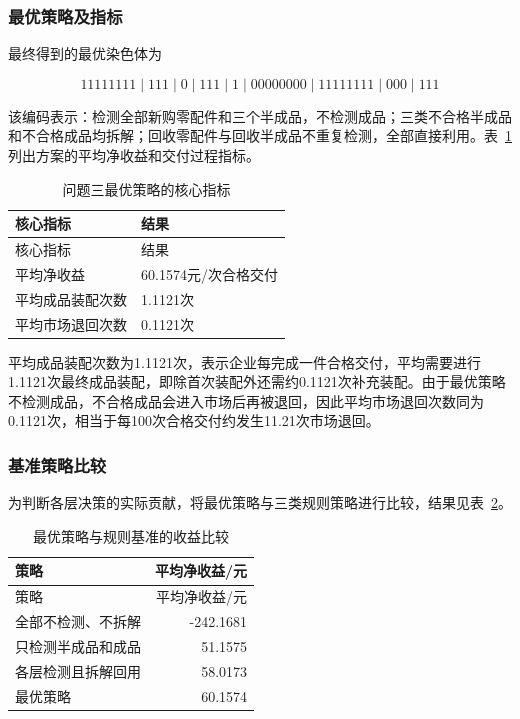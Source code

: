 \documentclass{cumcm}
\numberwithin{figure}{section}
\numberwithin{table}{section}
\begin{document}
\subsubsection{最优策略及指标}\label{ux6700ux4f18ux7b56ux7565ux53caux6307ux6807}

最终得到的最优染色体为

\[
11111111\mid111\mid0\mid111\mid1
\mid00000000\mid11111111\mid000\mid111
\]

该编码表示：检测全部新购零配件和三个半成品，不检测成品；三类不合格半成品和不合格成品均拆解；回收零配件与回收半成品不重复检测，全部直接利用。表~\ref{tab:p3-core-indicators} 列出方案的平均净收益和交付过程指标。

\begin{longtable}[]{@{}ll@{}}
\caption{问题三最优策略的核心指标}\label{tab:p3-core-indicators}\tabularnewline
\toprule\noalign{}
核心指标 & 结果 \\
\midrule\noalign{}
\endfirsthead
\toprule\noalign{}
核心指标 & 结果 \\
\midrule\noalign{}
\endhead
\bottomrule\noalign{}
\endlastfoot
平均净收益 & 60.1574元/次合格交付 \\
平均成品装配次数 & 1.1121次 \\
平均市场退回次数 & 0.1121次 \\
\end{longtable}

平均成品装配次数为1.1121次，表示企业每完成一件合格交付，平均需要进行1.1121次最终成品装配，即除首次装配外还需约0.1121次补充装配。由于最优策略不检测成品，不合格成品会进入市场后再被退回，因此平均市场退回次数同为0.1121次，相当于每100次合格交付约发生11.21次市场退回。

\subsubsection{基准策略比较}\label{ux57faux51c6ux7b56ux7565ux6bd4ux8f83}

为判断各层决策的实际贡献，将最优策略与三类规则策略进行比较，结果见表~\ref{tab:p3-baseline-comparison}。

\begin{longtable}[]{@{}lr@{}}
\caption{最优策略与规则基准的收益比较}\label{tab:p3-baseline-comparison}\tabularnewline
\toprule\noalign{}
策略 & 平均净收益/元 \\
\midrule\noalign{}
\endfirsthead
\toprule\noalign{}
策略 & 平均净收益/元 \\
\midrule\noalign{}
\endhead
\bottomrule\noalign{}
\endlastfoot
全部不检测、不拆解 & -242.1681 \\
只检测半成品和成品 & 51.1575 \\
各层检测且拆解回用 & 58.0173 \\
最优策略 & 60.1574 \\
\end{longtable}
\end{document}
